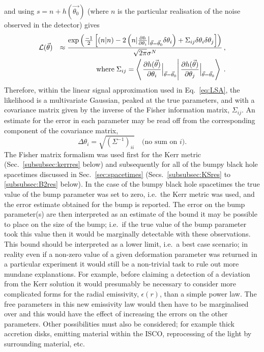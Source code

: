 and using $s=n+h(\vec{\theta_{0}})$ (where $n$ is the particular realisation of the noise observed in the detector) gives
\begin{eqnarray}\label{eq:likelihood2} 
&{\cal{L}}(\vec{\theta})&\approx \frac{\exp\left(\frac{-1}{2}\left[(n|n)-2\left(n|\frac{\partial h}{\partial\theta_{i}}\big|_{\vec{\theta}=\vec{\theta}_{0}}\delta\theta_{i}\right)+\Sigma_{ij}\delta\theta_{i}\delta\theta_{j}\right]\right)}{\sqrt{2\pi}\sigma^{N}}\, ,\nonumber\\
&&\;\textrm{where}\; \Sigma_{ij}=\left<\left.\frac{\partial h(\vec{\theta})}{\partial \theta_{i}}\Big|_{\vec{\theta}=\vec{\theta}_{0}}\right|\frac{\partial h(\vec{\theta})}{\partial \theta_{j}}\Big|_{\vec{\theta}=\vec{\theta}_{0}}\right> \; .\end{eqnarray}
Therefore, within the linear signal approximation used in Eq.\ \ref{eq:LSA}, the likelihood is a multivariate Gaussian, peaked at the true parameters, and with a covariance matrix given by the inverse of the Fisher information matrix, $\Sigma_{ij}$. An estimate for the error in each parameter may be read off from the corresponding component of the covariance matrix,
\begin{equation} \Delta\theta_{i}=\sqrt{\left(\Sigma^{-1}\right)_{ii}} \quad\textrm{(no sum on $i$).} \end{equation}
The Fisher matrix formalism was used first for the Kerr metric (Sec.\ \ref{subsubsec:kerrres} below) and subsequently for all of the bumpy black hole spacetimes discussed in Sec.\ \ref{sec:spacetimes} (Secs.\ \ref{subsubsec:KSres} to \ref{subsubsec:B2res} below). In the case of the bumpy black hole spacetimes the true value of the bump parameter was set to zero, i.e.\ the Kerr metric was used, and the error estimate obtained for the bump is reported. The error on the bump parameter(s) are then interpreted as an estimate of the bound it may be possible to place on the size of the bump; i.e.\ if the true value of the bump parameter took this value then it would be marginally detectable with these observations. This bound should be interpreted as a lower limit, i.e.\ a best case scenario; in reality even if a non-zero value of a given deformation parameter was returned in a particular experiment it would still be a non-trivial task to rule out more mundane explanations. For example, before claiming a detection of a deviation from the Kerr solution it would presumably be necessary to consider more complicated forms for the radial emissivity, $\epsilon(r)$, than a simple power law. The free parameters in this new emissivity law would then have to be marginalised over and this would have the effect of increasing the errors on the other parameters. Other possibilities must also be considered; for example thick accretion disks, emitting material within the ISCO, reprocessing of the light by surrounding material, etc.

